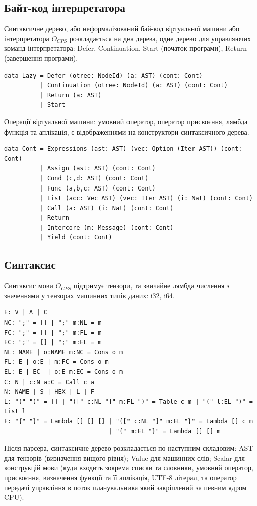 \subsection{Байт-код інтерпретатора}
Синтаксичне дерево, або неформалізований бай-код віртуальної
машини або інтерпретатора $O_{CPS}$ розкладається на два дерева, одне дерево
для управляючих команд інтерпретатора: Defer, Continuation, Start (початок програми),
Return (завершення програми).

\begin{lstlisting}
data Lazy = Defer (otree: NodeId) (a: AST) (cont: Cont)
          | Continuation (otree: NodeId) (a: AST) (cont: Cont)
          | Return (a: AST)
          | Start
\end{lstlisting}

Операції віртуальної машини: умовний оператор, оператор присвоєння, лямбда
функція та аплікація, є відображеннями на конструктори синтаксичного дерева.

\begin{lstlisting}
data Cont = Expressions (ast: AST) (vec: Option (Iter AST)) (cont: Cont)
          | Assign (ast: AST) (cont: Cont)
          | Cond (c,d: AST) (cont: Cont)
          | Func (a,b,c: AST) (cont: Cont)
          | List (acc: Vec AST) (vec: Iter AST) (i: Nat) (cont: Cont)
          | Call (a: AST) (i: Nat) (cont: Cont)
          | Return
          | Intercore (m: Message) (cont: Cont)
          | Yield (cont: Cont)
\end{lstlisting}

\subsection{Синтаксис}
Синтаксис мови $O_{CPS}$ підтримує тензори, та звичайне лямбда числення
з значеннями у тензорах машинних типів даних: i32, i64.

\begin{lstlisting}[mathescape=true]
E: V | A | C
NC: ";" = [] | ";" m:NL = m
FC: ";" = [] | ";" m:FL = m
EC: ";" = [] | ";" m:EL = m
NL: NAME | o:NAME m:NC = Cons o m
FL: E | o:E | m:FC = Cons o m
EL: E | EC  | o:E m:EC = Cons o m
C: N | c:N a:C = Call c a
N: NAME | S | HEX | L | F
L: "(" ")" = [] | "([" c:NL "]" m:FL ")" = Table c m | "(" l:EL ")" = List l
F: "{" "}" = Lambda [] [] [] | "{[" c:NL "]" m:EL "}" = Lambda [] c m
                             | "{" m:EL "}" = Lambda [] [] m
\end{lstlisting}

Після парсера, синтаксичне дерево розкладається по наступним складовим: AST для
тензорів (визначення вищого рівня); Value для машинних слів; Scalar для
конструкцій мови (куди входить зокрема списки та словники, умовний оператор,
присвоєння, визначення функції та її аплікація, UTF-8 літерал, та оператор
передачі управління в поток планувальника який закріплений за певним ядром CPU).

